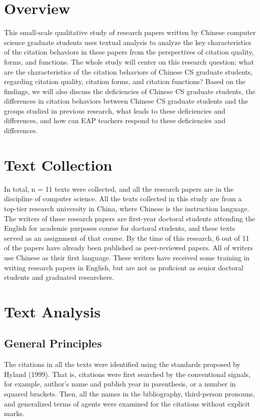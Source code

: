 \section{Overview}
This small-scale qualitative study of research papers written by Chinese computer science graduate students uses textual analysis to analyze the key characteristics of the citation behaviors in these papers from the perspectives of citation quality, forms, and functions. The whole study will center on this research question: what are the characteristics of the citation behaviors of Chinese CS graduate students, regarding citation quality, citation forms, and citation functions? Based on the findings, we will also discuss the deficiencies of Chinese CS graduate students, the differences in citation behaviors between Chinese CS graduate students and the groups studied in previous research, what leads to these deficiencies and differences, and how can EAP teachers respond to these deficiencies and differences.

\section{Text Collection}
In total, n = 11 texts were collected, and all the research papers are in the discipline of computer science. All the texts collected in this study are from a top-tier research university in China, where Chinese is the instruction language. The writers of these research papers are first-year doctoral students attending the English for academic purposes course for doctoral students, and these texts served as an assignment of that course. By the time of this research, 6 out of 11 of the papers have already been published as peer-reviewed papers. All of writers use Chinese as their first language. These writers have received some training in writing research papers in English, but are not as proficient as senior doctoral students and graduated researchers.

\section{Text Analysis}
\subsection{General Principles}
The citations in all the texts were identified using the standards proposed by Hyland (1999). That is, citations were first searched by the conventional signals, for example, author’s name and publish year in parenthesis, or a number in squared brackets. Then, all the names in the bibliography, third-person pronouns, and generalized terms of agents were examined for the citations without explicit marks.

